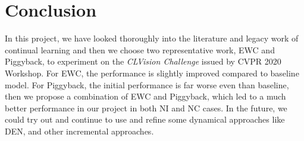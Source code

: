 \section{Conclusion}\label{conclusion}
In this project, we have looked thoroughly into the literature and legacy work of continual learning and then we choose two representative work, EWC and Piggyback, to experiment on the \textit{CLVision Challenge} issued by CVPR 2020 Workshop. For EWC, the performance is slightly improved compared to baseline model. For Piggyback, the initial performance is far worse even than baseline, then we propose a combination of EWC and Piggyback, which led to a much better performance in our project in both NI and NC cases. In the future, we could try out and continue to use and refine some dynamical approaches like DEN, and other incremental approaches\cite{zhou2012online}. 